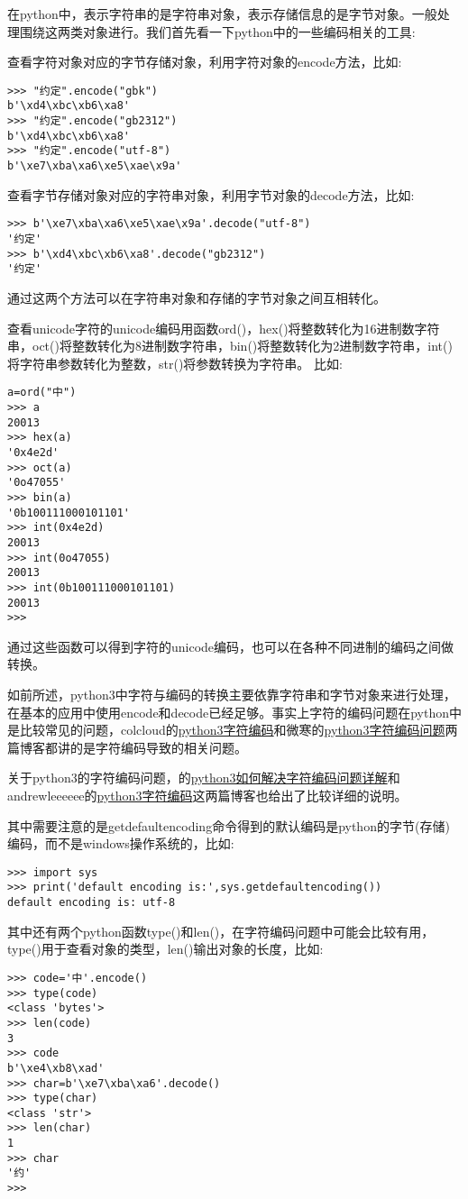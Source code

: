 \documentclass[twoside,11pt]{book}
\begin{document}
在python中，表示字符串的是字符串对象，表示存储信息的是字节对象。一般处理围绕这两类对象进行。我们首先看一下python中的一些编码相关的工具:

查看字符对象对应的字节存储对象，利用字符对象的encode方法，比如:
\begin{lstlisting}
>>> "约定".encode("gbk")
b'\xd4\xbc\xb6\xa8'
>>> "约定".encode("gb2312")
b'\xd4\xbc\xb6\xa8'
>>> "约定".encode("utf-8")
b'\xe7\xba\xa6\xe5\xae\x9a'
\end{lstlisting}

查看字节存储对象对应的字符串对象，利用字节对象的decode方法，比如:
\begin{lstlisting}
>>> b'\xe7\xba\xa6\xe5\xae\x9a'.decode("utf-8")
'约定'
>>> b'\xd4\xbc\xb6\xa8'.decode("gb2312")
'约定'
\end{lstlisting}

通过这两个方法可以在字符串对象和存储的字节对象之间互相转化。

查看unicode字符的unicode编码用函数ord()，hex()将整数转化为16进制数字符串，oct()将整数转化为8进制数字符串，bin()将整数转化为2进制数字符串，int()将字符串参数转化为整数，str()将参数转换为字符串。
比如:
\begin{lstlisting}
a=ord("中")
>>> a
20013
>>> hex(a)
'0x4e2d'
>>> oct(a)
'0o47055'
>>> bin(a)
'0b100111000101101'
>>> int(0x4e2d)
20013
>>> int(0o47055)
20013
>>> int(0b100111000101101)
20013
>>>
\end{lstlisting}

通过这些函数可以得到字符的unicode编码，也可以在各种不同进制的编码之间做转换。

如前所述，python3中字符与编码的转换主要依靠字符串和字节对象来进行处理，在基本的应用中使用encode和decode已经足够。事实上字符的编码问题在python中是比较常见的问题，colcloud的\href{www.unicode.org}{python3字符编码}和微寒的\href{www.unicode.org}{python3字符编码问题}两篇博客都讲的是字符编码导致的相关问题。


关于python3的字符编码问题，的\href{www.unicode.org}{python3如何解决字符编码问题详解}和andrewleeeeee的\href{www.unicode.org}{python3字符编码}这两篇博客也给出了比较详细的说明。

其中需要注意的是getdefaultencoding命令得到的默认编码是python的字节(存储)编码，而不是windows操作系统的，比如:
\begin{lstlisting}
>>> import sys
>>> print('default encoding is:',sys.getdefaultencoding())
default encoding is: utf-8
\end{lstlisting}

其中还有两个python函数type()和len()，在字符编码问题中可能会比较有用，type()用于查看对象的类型，len()输出对象的长度，比如:
\begin{lstlisting}
>>> code='中'.encode()
>>> type(code)
<class 'bytes'>
>>> len(code)
3
>>> code
b'\xe4\xb8\xad'
>>> char=b'\xe7\xba\xa6'.decode()
>>> type(char)
<class 'str'>
>>> len(char)
1
>>> char
'约'
>>>
\end{lstlisting}
\end{document}
